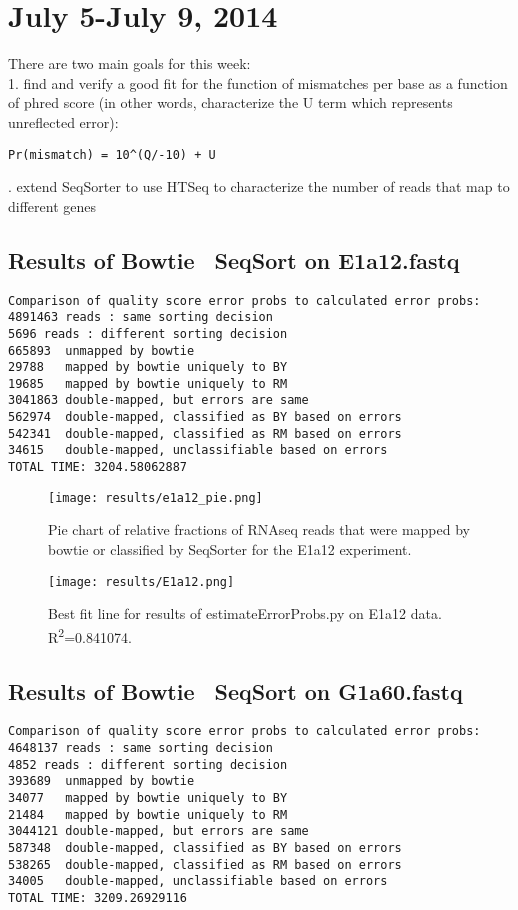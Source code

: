 \documentclass[11pt]{article}
\begin{document}
\section*{July 5-July 9, 2014}
There are two main goals for this week: \\
1. find and verify a good fit for the function of mismatches per base as a function of phred score (in other words, characterize the U term which represents unreflected error):
\begin{verbatim}
Pr(mismatch) = 10^(Q/-10) + U
\end{verbatim}
. extend SeqSorter to use HTSeq to characterize the number of reads that map to different genes
\\
\noindent
\pagebreak
\subsection*{Results of Bowtie \textbar \ SeqSort on E1a12.fastq}
\begin{verbatim}
Comparison of quality score error probs to calculated error probs:
4891463 reads : same sorting decision
5696 reads : different sorting decision
665893	unmapped by bowtie
29788	mapped by bowtie uniquely to BY
19685	mapped by bowtie uniquely to RM
3041863	double-mapped, but errors are same
562974	double-mapped, classified as BY based on errors
542341	double-mapped, classified as RM based on errors
34615	double-mapped, unclassifiable based on errors
TOTAL TIME: 3204.58062887
\end{verbatim}

\begin{figure}[!htpb]
\centering
\texttt{[image: results/e1a12\_pie.png]}
\caption{Pie chart of relative fractions of RNAseq reads that were mapped by bowtie or classified by SeqSorter for the E1a12 experiment.}
\label{fig:e1a12_pie}
\end{figure}
\pagebreak

\begin{figure}[!htpb]
\centering
\texttt{[image: results/E1a12.png]}
\caption{Best fit line for results of estimateErrorProbs.py on E1a12 data. R\textsuperscript{2}=0.841074.}
\label{fig:e1a12}
\end{figure}

\subsection*{Results of Bowtie \textbar \ SeqSort on G1a60.fastq}
\begin{verbatim}
Comparison of quality score error probs to calculated error probs:
4648137 reads : same sorting decision
4852 reads : different sorting decision
393689	unmapped by bowtie
34077	mapped by bowtie uniquely to BY
21484	mapped by bowtie uniquely to RM
3044121	double-mapped, but errors are same
587348	double-mapped, classified as BY based on errors
538265	double-mapped, classified as RM based on errors
34005	double-mapped, unclassifiable based on errors
TOTAL TIME: 3209.26929116
\end{verbatim}
\end{document}
